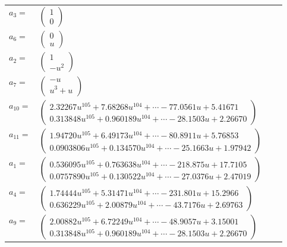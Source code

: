 \documentclass[1p]{elsarticle_modified}
\theoremstyle{definition}
\begin{document}
\begin{tabular}{m{7pt} m{180pt} m{7pt} m{180pt} }
\flushright $a_{3}=$&$\begin{pmatrix}1\\0\end{pmatrix}$ \\
\flushright $a_{6}=$&$\begin{pmatrix}0\\u\end{pmatrix}$ \\
\flushright $a_{2}=$&$\begin{pmatrix}1\\- u^2\end{pmatrix}$ \\
\flushright $a_{7}=$&$\begin{pmatrix}- u\\u^3+u\end{pmatrix}$ \\
\flushright $a_{10}=$&$\begin{pmatrix}2.32267 u^{105}+7.68268 u^{104}+\cdots-77.0561 u+5.41671\\0.313848 u^{105}+0.960189 u^{104}+\cdots-28.1503 u+2.26670\end{pmatrix}$ \\
\flushright $a_{11}=$&$\begin{pmatrix}1.94720 u^{105}+6.49173 u^{104}+\cdots-80.8911 u+5.76853\\0.0903806 u^{105}+0.134570 u^{104}+\cdots-25.1663 u+1.97942\end{pmatrix}$ \\
\flushright $a_{1}=$&$\begin{pmatrix}0.536095 u^{105}+0.763638 u^{104}+\cdots-218.875 u+17.7105\\0.0757890 u^{105}+0.130522 u^{104}+\cdots-27.0376 u+2.47019\end{pmatrix}$ \\
\flushright $a_{4}=$&$\begin{pmatrix}1.74444 u^{105}+5.31471 u^{104}+\cdots-231.801 u+15.2966\\0.636229 u^{105}+2.00879 u^{104}+\cdots-43.7176 u+2.69763\end{pmatrix}$ \\
\flushright $a_{9}=$&$\begin{pmatrix}2.00882 u^{105}+6.72249 u^{104}+\cdots-48.9057 u+3.15001\\0.313848 u^{105}+0.960189 u^{104}+\cdots-28.1503 u+2.26670\end{pmatrix}$ \\

\end{tabular}
\end{document}
